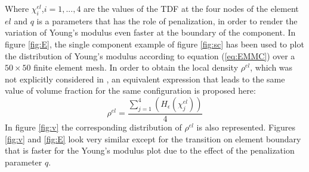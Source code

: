 Where $\chi_i^{el}$,$i=1,...,4$ are the values of the TDF at the four nodes of the element $el$ and $q$ is a parameters that has the role of penalization, in order to render the variation of Young's modulus even faster at the boundary of the component. In figure \ref{fig:E}, the single component example of figure \ref{fig:sc} has been used to plot the distribution of Young's modulus according to equation (\ref{eq:EMMC}) over a $50\times50$ finite element mesh. In order to obtain the local density $\rho^{el}$, which was not explicitly considered in \cite{zhang2016new}, an equivalent expression that leads to the same value of volume fraction for the same configuration is proposed here:
\begin{equation}
    \rho^{el}=\frac{\sum_{j=1}^4(H_{\epsilon}(\chi_j^{el}))}{4}
\end{equation}
In figure \ref{fig:v} the corresponding distribution of $\rho^{el}$ is also represented. Figures \ref{fig:v} and \ref{fig:E} look  very similar except for the transition on element boundary that is faster for the Young's modulus plot due to the effect of the penalization parameter $q$.

